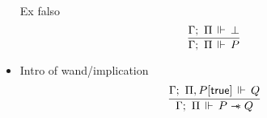 \begin{itemize}
  Ex falso
  \[
  \infer{\entailsD P}
        {\entailsD \bot}
  \]
\item Intro of wand/implication
  \[
  \infer{\entailsD P \wand Q}
        {\entails {\IntuD} {\SpatD , P[\true]} {Q}}
  \]


\end{itemize}
